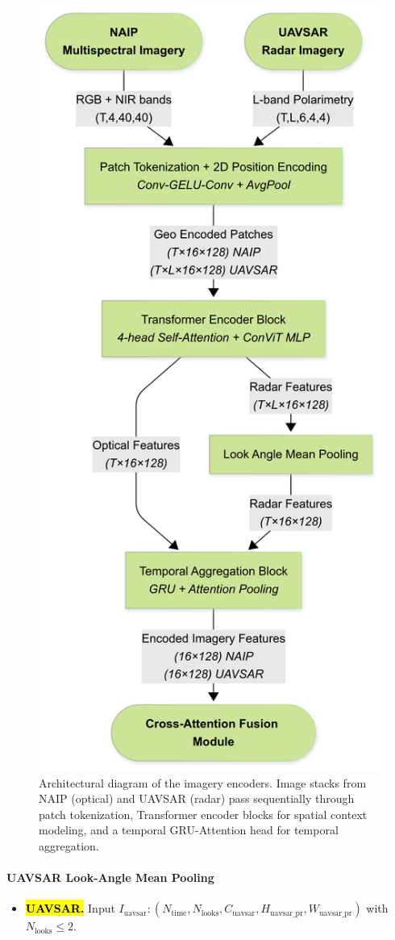 \documentclass[remotesensing,article,accept,pdftex,moreauthors]{Definitions/mdpi}
\begin{document}
\begin{figure}[H]

    \includegraphics[trim=0mm 0mm 20mm 0mm, clip, width=0.57\linewidth]{figures/Imagery_Encoders.png}
    \caption{Architectural diagram of the imagery encoders. Image stacks from NAIP (optical) and UAVSAR (radar) pass sequentially through patch tokenization, Transformer encoder blocks for spatial context modeling, and a temporal GRU-Attention head for temporal aggregation.}
    \label{fig:imgenc}
\end{figure}





\paragraph{UAVSAR Look-Angle Mean Pooling}
\begin{itemize}[leftmargin=*]
\item \textbf{\hl{UAVSAR.}}
      Input $I_{\text{uavsar}}: (N_{\text{time}}, N_{\text{looks}}, C_{\text{uavsar}}, H_{\text{uavsar\_pr}}, W_{\text{uavsar\_pr}})$ with \mbox{$N_{\text{looks}} \leq 2$}.
\end{itemize}
\end{document}
